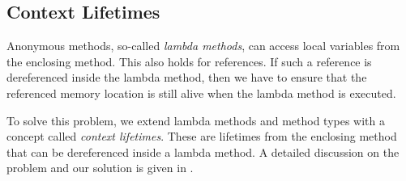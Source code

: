 \subsection{Context Lifetimes}\label{section:design-context-lifetimes}

Anonymous methods, so-called \emph{lambda methods}, can access local variables from the enclosing method.
This also holds for references.
If such a reference is dereferenced inside the lambda method, then we have to ensure that the referenced memory location is still alive when the lambda method is executed.

To solve this problem, we extend lambda methods and method types with a concept called \emph{context lifetimes}.
These are lifetimes from the enclosing method that can be dereferenced inside a lambda method.
A detailed discussion on the problem and our solution is given in .
